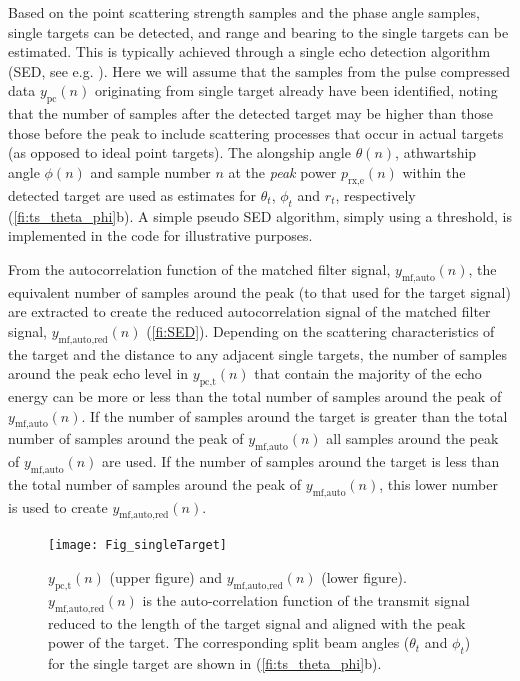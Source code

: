 \documentclass[preprint,12pt,TurnOnLineNumbers]{JASAnew}
\newcommand{\samplesymt}{n}
\newcommand{\prxe}{p_{\textrm{rx,e}}}
\newcommand{\ypc}{y_{\textrm{pc}}}
\newcommand{\ypctarget}{y_{\textrm{pc,t}}}
\newcommand{\ymfauto}{y_{\textrm{mf,auto}}}
\newcommand{\ymfautored}{y_{\textrm{mf,auto,red}}}
\newcommand{\athw}{\phi}
\newcommand{\along}{\theta}
\begin{document}
Based on the point scattering strength samples and the phase angle samples, single targets can be detected, and range and bearing to the single targets can be estimated. This is typically achieved through a single echo detection algorithm (SED, see e.g. \citet{OnaCRRTS}). Here we will assume that the samples from the pulse compressed data $\ypc(\samplesymt)$ originating from single target already have been identified, noting that the number of samples after the detected target may be higher than those those before the peak to include scattering processes that occur in actual targets (as opposed to ideal point targets). The alongship angle $\along(\samplesymt)$, athwartship angle $\athw(\samplesymt)$ and sample number $n$ at the \emph{peak} power $\prxe(\samplesymt)$ within the detected target are used as estimates for $\along_t$, $\athw_t$ and $r_t$, respectively (\autoref{fi:ts_theta_phi}b). A simple pseudo SED algorithm, simply using a threshold, is implemented in the code for illustrative purposes.

From the autocorrelation function of the matched filter signal, $\ymfauto(\samplesymt)$, the equivalent number of samples around the peak (to that used for the target signal) are extracted to create the reduced autocorrelation signal of the matched filter signal, $\ymfautored(\samplesymt)$ (\autoref{fi:SED}). Depending on the scattering characteristics of the target and the distance to any adjacent single targets, the number of samples around the peak echo level in $\ypctarget(\samplesymt)$ that contain the majority of the echo energy can be more or less than the total number of samples around the peak of $\ymfauto(\samplesymt)$. If the number of samples around the target is greater than the total number of samples around the peak of $\ymfauto(\samplesymt)$ all samples around the peak of $\ymfauto(\samplesymt)$ are used. If the number of samples around the target is less than the total number of samples around the peak of $\ymfauto(\samplesymt)$, this lower number is used to create $\ymfautored(\samplesymt)$.
%
\begin{figure}
\texttt{[image: Fig\_singleTarget]}
\caption{\label{fi:SED} $\ypctarget(\samplesymt)$ (upper figure) and $\ymfautored(\samplesymt)$ (lower figure). $\ymfautored(\samplesymt)$ is the auto-correlation function of the transmit signal reduced to the length of the target signal and aligned with the peak power of the target. The corresponding split beam angles ($\along_t$ and $\athw_t$) for the single target are shown in (\autoref{fi:ts_theta_phi}b).}
\end{figure}
\end{document}
